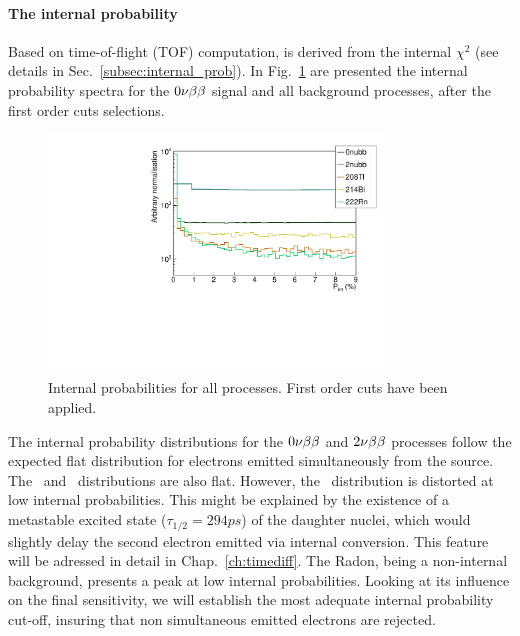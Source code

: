 \paragraph{The internal probability}
Based on time-of-flight (TOF) computation, is derived from the internal $\chi^{2}$ (see details in Sec.~\ref{subsec:internal_prob}).
In Fig.~\ref{fig:Pint} are presented the internal probability spectra for the $0\nu\beta\beta$ signal and all background processes, after the first order cuts selections.
\begin{figure}[h]
  \centering
  \includegraphics[width=0.8\textwidth]{Sensitivity/fig_sensitivity/InternalProbability.pdf}
  \caption{Internal probabilities for all processes.
    First order cuts have been applied.
    \label{fig:Pint}}
\end{figure}
The internal probability distributions for the $0\nu\beta\beta$ and $2\nu\beta\beta$ processes follow the expected flat distribution for electrons emitted simultaneously from the source.
The \Tl\ and \Bi\ distributions are also flat.
However, the \Tl\ distribution is distorted at low internal probabilities.
This might be explained by the existence of a metastable excited state ($\tau_{1/2} = 294 ps$) of the daughter nuclei, which would slightly delay the second electron emitted via internal conversion.
This feature will be adressed in detail in Chap.~\ref{ch:timediff}.
The Radon, being a non-internal background, presents a peak at low internal probabilities.
Looking at its influence on the final sensitivity, we will establish the most adequate internal probability cut-off, insuring that non simultaneous emitted electrons are rejected.

